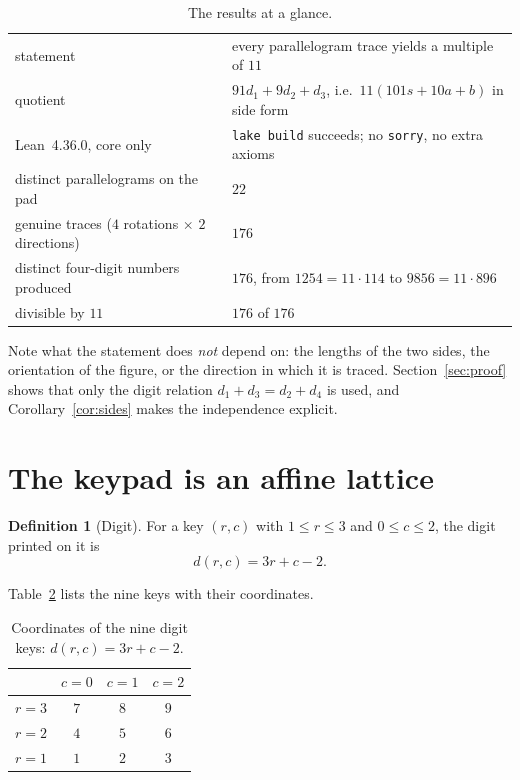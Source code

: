 \documentclass[11pt,a4paper]{article}
\theoremstyle{definition}
\newtheorem{definition}[theorem]{Definition}
\theoremstyle{remark}
\newcommand{\code}[1]{\texttt{#1}}
\begin{document}
\begin{table}[htbp]
\centering
\caption{The results at a glance.}
\label{tab:summary}
\small
\begin{tabular}{@{}>{\raggedright\arraybackslash}p{4.6cm}
                    >{\raggedright\arraybackslash}p{10.0cm}@{}}
\toprule
statement & every parallelogram trace yields a multiple of $11$\\
quotient & $91d_1+9d_2+d_3$, i.e.\ $11(101s+10a+b)$ in side form\\
Lean~4.36.0, core only & \code{lake build} succeeds; no \code{sorry}, no extra axioms\\
distinct parallelograms on the pad & $22$\\
genuine traces ($4$ rotations $\times$ $2$ directions) & $176$\\
distinct four-digit numbers produced & $176$, from $1254=11\cdot114$ to $9856=11\cdot896$\\
divisible by $11$ & $176$ of $176$\\
\bottomrule
\end{tabular}
\end{table}

Note what the statement does \emph{not} depend on: the lengths of the two sides, the
orientation of the figure, or the direction in which it is traced. Section~\ref{sec:proof}
shows that only the digit relation $d_1+d_3=d_2+d_4$ is used, and Corollary~\ref{cor:sides}
makes the independence explicit.

\section{The keypad is an affine lattice}

\begin{definition}[Digit]
\label{def:digit}
For a key $(r,c)$ with $1\le r\le 3$ and $0\le c\le 2$, the digit printed on it is
\[
d(r,c)=3r+c-2 .
\]
\end{definition}

Table~\ref{tab:coords} lists the nine keys with their coordinates.

\begin{table}[htbp]
\centering
\caption{Coordinates of the nine digit keys: $d(r,c)=3r+c-2$.}
\label{tab:coords}
\begin{tabular}{@{}lccc@{}}
\toprule
 & $c=0$ & $c=1$ & $c=2$\\
\midrule
$r=3$ & $7$ & $8$ & $9$\\
$r=2$ & $4$ & $5$ & $6$\\
$r=1$ & $1$ & $2$ & $3$\\
\bottomrule
\end{tabular}
\end{table}
\end{document}
